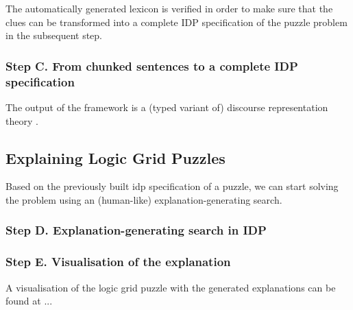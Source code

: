 The automatically generated lexicon is verified in order to make sure that the clues can be transformed into a complete IDP specification of the puzzle problem in the subsequent step.

\subsubsection*{Step C. From chunked sentences to a complete IDP specification} \label{chunked_to_logic}

The output of the framework is a (typed variant of) discourse representation theory \cite{DRT}. 




\subsection{Explaining Logic Grid Puzzles} \label{explaining_puzzles}
Based on the previously built idp specification of a puzzle, we can start solving the problem using an (human-like) explanation-generating search.

\subsubsection*{Step D. Explanation-generating search in IDP} \label{idp_search}


\subsubsection*{Step E. Visualisation of the explanation} \label{visualisation_explanation}
A visualisation of the logic grid puzzle with the generated explanations can be found at ...
